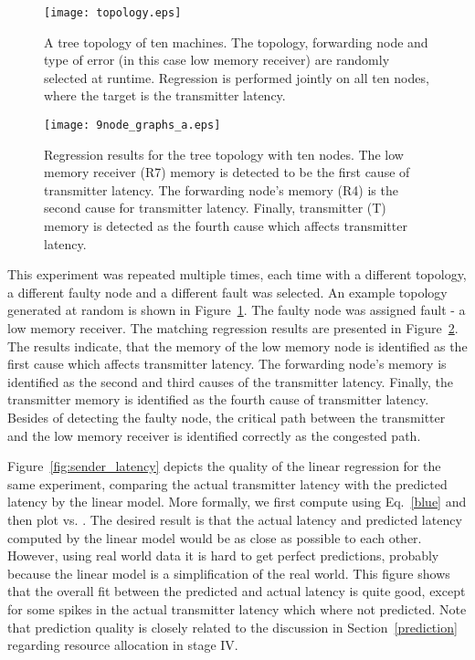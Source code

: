 \documentclass[times, 10pt,twocolumn]{article}
\begin{document}
\begin{figure}[ht!]
\begin{center}
\texttt{[image: topology.eps]}\\
  \caption{A tree topology of ten machines. The topology, forwarding node and type of error (in this case low memory receiver) are randomly selected at runtime. Regression is performed jointly on all ten nodes, where the target is the transmitter latency.}\label{fig:topology}
\end{center}
\end{figure}

\begin{figure}[ht!]
\begin{center}
\texttt{[image: 9node\_graphs\_a.eps]}\\
  \caption{Regression results for the tree topology with ten nodes. The low memory receiver (R7) memory is detected to be the first cause of transmitter latency. The forwarding node's memory (R4) is the second cause for transmitter latency. Finally, transmitter (T) memory is detected as the fourth cause which affects transmitter latency. }\label{fig:9nodes_reg}
\end{center}
\end{figure}


This experiment was repeated multiple times, each time with a different topology, a different faulty node and a different fault was selected. An example topology generated at random is shown in Figure~\ref{fig:topology}. The faulty node was assigned fault  - a low memory receiver. The matching regression results are presented in Figure~\ref{fig:9nodes_reg}. The results indicate, that the memory of the low memory node is identified as the first cause which affects transmitter latency. The forwarding node's memory is identified as the second and third causes of the transmitter latency. Finally, the transmitter memory is identified as the fourth cause of transmitter latency.
Besides of detecting the faulty node, the critical path between the transmitter and the low memory receiver
is identified correctly as the congested path.

Figure~\ref{fig:sender_latency} depicts the quality of the linear regression for the same experiment, comparing the actual transmitter latency with the predicted latency by the linear model. More formally, we first compute  using Eq.~\ref{blue} and then plot  vs. . The desired result is that the actual latency and predicted latency
computed by the linear model would be as close as possible to each other. However, using real world data it is hard
to get perfect predictions, probably because the linear model is a simplification of the real world.
This figure shows that the overall fit between the predicted and actual latency is quite good, except for some spikes
in the actual transmitter latency which where not predicted. Note that prediction quality is closely related to the discussion in Section~\ref{prediction} regarding resource allocation in stage IV. 
\end{document}

